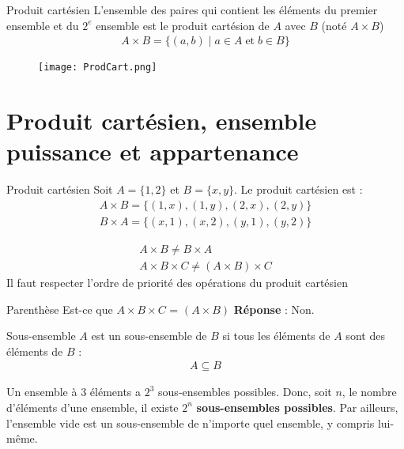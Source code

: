 \documentclass[8pt]{report}
\begin{document}
\begin{multicols*}{2}
\begin{Definition}{Produit cartésien}{}
   L'ensemble des paires qui contient les éléments du premier ensemble et du $2^e$ ensemble est le 
   produit cartésion de $A$ avec $B$ (noté $A \times B$)
   \begin{align}
     A \times B = \{ (a,b) \; | \;  a \in A \; \text{et} \; b \in B \}
   \end{align}
   
\end{Definition}

\begin{figure}[H]
    \begin{center}
        \texttt{[image: ProdCart.png]}
    \end{center}
\end{figure}



\section{Produit cartésien, ensemble puissance et appartenance}
\begin{EExample}{Produit cartésien}{}
  Soit $A = \{ 1, 2\}$ et $B = \{ x, y\}$. Le produit cartésien est :
  \begin{align*}
    A \times B = \{ (1,x), (1,y), (2,x), (2,y)      \}\\
    B \times A = \{ (x,1), (x,2), (y,1), (y,2)      \} 
  \end{align*}
\end{EExample}


\begin{note}{}{}
  \begin{align*}
    A \times B \neq B \times A \\ 
    A \times B \times C \neq \left( A \times B \right) \times C
  \end{align*}
  Il faut respecter l'ordre de priorité des opérations du produit cartésien 
\end{note}

\begin{qstion}{Parenthèse}{}
    Est-ce que $A \times B \times C$ = $\left(A \times B\right)$
    \textbf{Réponse} : Non. %
\end{qstion}

\begin{Definition}{Sous-ensemble}{}
  $A$ est un sous-ensemble de $B$ si tous les éléments de $A$ sont des éléments de $B$ : 
  \begin{align*}
              A \subseteq B
  \end{align*}
\end{Definition}
\begin{note}{}{}
    Un ensemble à $3$ éléments a $2^3$ sous-ensembles possibles. Donc, soit $n$, le nombre d'éléments 
    d'une ensemble, il existe $2^n$ \textbf{sous-ensembles possibles}. Par ailleurs, 
    l'ensemble vide est un sous-ensemble de n'importe quel ensemble, y compris lui-même. 


\end{note}
\end{multicols*}
\end{document}

